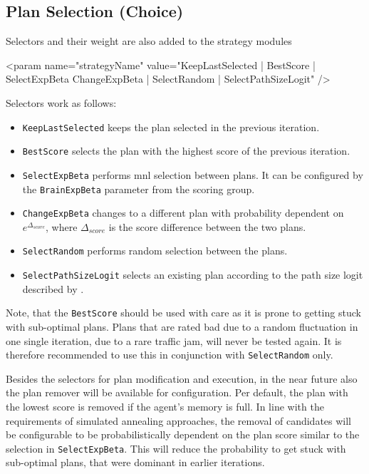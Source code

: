 \subsection{Plan Selection (Choice)}
\label{sec:selectors}
Selectors and their weight are also added to the strategy modules
%
\begin{xml}
	<param name="strategyName" value="KeepLastSelected | BestScore | SelectExpBeta
					ChangeExpBeta | SelectRandom | SelectPathSizeLogit" />
\end{xml}
%
Selectors work as follows:
%
\begin{itemize}\styleItemize
	\item \lstinline|KeepLastSelected| keeps the plan selected in the previous iteration.
	\item \lstinline|BestScore| selects the plan with the highest score of the previous iteration.
	\item \lstinline|SelectExpBeta| performs \gls{mnl} selection between plans. It can be configured by the \lstinline|BrainExpBeta| parameter from the scoring group.
	\item \lstinline|ChangeExpBeta| changes to a different plan with probability dependent on $e^{\Delta_{score}}$, where $\Delta_{score}$ is the score difference between the two plans.
	\item \lstinline|SelectRandom| performs random selection between the plans.
	\item \lstinline|SelectPathSizeLogit| selects an existing plan according to the path size logit described by \citet[][]{FrejingerBierlaire_TransResB_2007}.
\end{itemize}
%
Note, that the \lstinline|BestScore| should be used with care as it is prone to getting stuck with sub-optimal plans. Plans that are rated bad due to a random fluctuation in one single iteration, due to \eg a rare traffic jam, will never be tested again. It is therefore recommended to use this in conjunction with \lstinline|SelectRandom| only.

Besides the selectors for plan modification and execution, in the near future also the plan remover will be available for configuration. Per default, the plan with the lowest score is removed if the agent's memory is full. In line with the requirements of \eg simulated annealing approaches, the removal of candidates will be configurable to be probabilistically dependent on the plan score similar to the selection in \lstinline|SelectExpBeta|. This will reduce the probability to get stuck with sub-optimal plans, that were dominant in earlier iterations.

